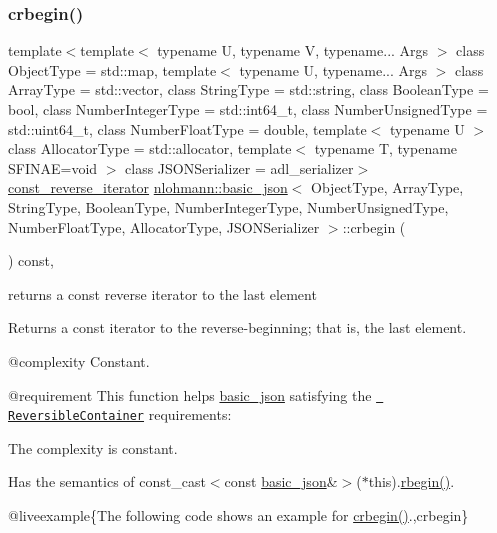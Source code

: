 \subsubsection{\texorpdfstring{crbegin()}{crbegin()}}
{\footnotesize\ttfamily template$<$template$<$ typename U, typename V, typename... Args $>$ class Object\+Type = std\+::map, template$<$ typename U, typename... Args $>$ class Array\+Type = std\+::vector, class String\+Type  = std\+::string, class Boolean\+Type  = bool, class Number\+Integer\+Type  = std\+::int64\+\_\+t, class Number\+Unsigned\+Type  = std\+::uint64\+\_\+t, class Number\+Float\+Type  = double, template$<$ typename U $>$ class Allocator\+Type = std\+::allocator, template$<$ typename T, typename S\+F\+I\+N\+A\+E=void $>$ class J\+S\+O\+N\+Serializer = adl\+\_\+serializer$>$ \\
\mbox{\hyperlink{classnlohmann_1_1basic__json_a72be3c24bfa24f0993d6c11af03e7404}{const\+\_\+reverse\+\_\+iterator}} \mbox{\hyperlink{classnlohmann_1_1basic__json}{nlohmann\+::basic\+\_\+json}}$<$ Object\+Type, Array\+Type, String\+Type, Boolean\+Type, Number\+Integer\+Type, Number\+Unsigned\+Type, Number\+Float\+Type, Allocator\+Type, J\+S\+O\+N\+Serializer $>$\+::crbegin (\begin{DoxyParamCaption}{ }\end{DoxyParamCaption}) const\hspace{0.3cm}{\ttfamily [inline]}, {\ttfamily [noexcept]}}



returns a const reverse iterator to the last element 

Returns a const iterator to the reverse-\/beginning; that is, the last element.

 @complexity Constant.

@requirement This function helps {\ttfamily \mbox{\hyperlink{classnlohmann_1_1basic__json}{basic\+\_\+json}}} satisfying the \href{http://en.cppreference.com/w/cpp/concept/ReversibleContainer}{\texttt{ Reversible\+Container}} requirements\+:
\begin{DoxyItemize}
\item The complexity is constant.
\item Has the semantics of {\ttfamily const\+\_\+cast$<$const \mbox{\hyperlink{classnlohmann_1_1basic__json}{basic\+\_\+json}}\&$>$($\ast$this).\mbox{\hyperlink{classnlohmann_1_1basic__json_a1ef93e2006dbe52667294f5ef38b0b10}{rbegin()}}}.
\end{DoxyItemize}

@liveexample\{The following code shows an example for {\ttfamily \mbox{\hyperlink{classnlohmann_1_1basic__json_a1e0769d22d54573f294da0e5c6abc9de}{crbegin()}}}.,crbegin\}

